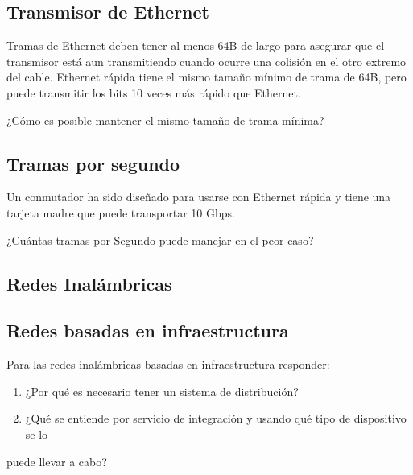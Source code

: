 \documentclass[12pt]{report}
\begin{document}
\begin{exer}
\subsection{Transmisor de Ethernet \stwo \steo}
Tramas de Ethernet deben tener al menos 64B de largo para asegurar que el transmisor está aun transmitiendo cuando ocurre una colisión en el otro extremo del cable. Ethernet rápida tiene el mismo tamaño mínimo de trama de 64B, pero puede transmitir los bits 10 veces más rápido que Ethernet.

¿Cómo es posible mantener el mismo tamaño de trama mínima?
\end{exer}

\begin{exer}
\subsection{Tramas por segundo \stwo}
Un conmutador ha sido diseñado para usarse con Ethernet rápida y tiene una tarjeta madre que puede transportar 10 Gbps. 

¿Cuántas tramas por Segundo puede manejar en el peor caso?
\end{exer}

\begin{exer}
\section{Redes Inalámbricas}
\subsection{Redes basadas en infraestructura \sthree \steo}
Para las redes inalámbricas basadas en infraestructura responder:

\begin{enumerate}
\item ¿Por qué es necesario tener un sistema de distribución?
\item ¿Qué se entiende por servicio de integración y usando qué tipo de dispositivo se lo
\end{enumerate}
puede llevar a cabo?
\end{exer}
\end{document}
